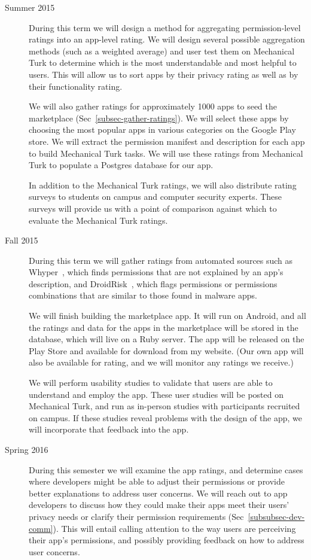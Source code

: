 \documentclass[11pt]{article}
\begin{document}
\begin{description}

\item[Summer 2015]
During this term we will design a method for aggregating 
permission-level ratings into an app-level rating. We will 
design several possible aggregation methods (such as a 
weighted average) and user test them on Mechanical
Turk to determine which is the most understandable and most
helpful to users. This will allow us to sort apps by their privacy 
rating as well as by their functionality rating.

We will also gather ratings for approximately 1000 apps to seed 
the marketplace (Sec~\ref{subsec-gather-ratings}). We will select these
apps by choosing the most popular apps in various categories on 
the Google Play store. We will extract the permission manifest and 
description for each app to build Mechanical Turk tasks. We will 
use these ratings from Mechanical Turk to populate a Postgres database 
for our app.

In addition to the Mechanical Turk ratings, we will also distribute
rating surveys to students on campus and computer security experts.
These surveys will provide us with a point of comparison against 
which to evaluate the Mechanical Turk ratings. 

\item[Fall 2015]

During this term we will gather ratings from automated sources 
such as Whyper~\cite{whyper-SEC13}, which finds permissions 
that are not explained by an app's description, and 
DroidRisk~\cite{droidrisk-2013}, which flags permissions or 
permissions combinations that are similar to those found in 
malware apps.

We will finish building the marketplace app. It 
will run on Android, and all the ratings and data for the apps in
the marketplace will be 
stored in the database, which will live on a Ruby server. The app 
will be released on the Play Store and available for download 
from my website. (Our own app will also be available for rating, 
and we will monitor any ratings we receive.)

We will perform usability studies to validate that users are able 
to understand and employ the app. These user studies will be posted
on Mechanical Turk, and run as in-person studies with participants
recruited on campus. If these studies reveal problems with the 
design of the app, we will incorporate that feedback into the app.

\item[Spring 2016] 
During this semester we will examine the app ratings, and determine 
cases where developers might be able to adjust their permissions
or provide better explanations to address user concerns. We will 
reach out to app developers to discuss how they could make their 
apps meet their users' privacy needs or clarify their permission 
requirements (Sec~\ref{subsubsec-dev-comm}). 
This will entail calling attention to the way users are perceiving 
their app's permissions, and possibly providing feedback on how
to address user concerns.

\end{description}
\end{document}
